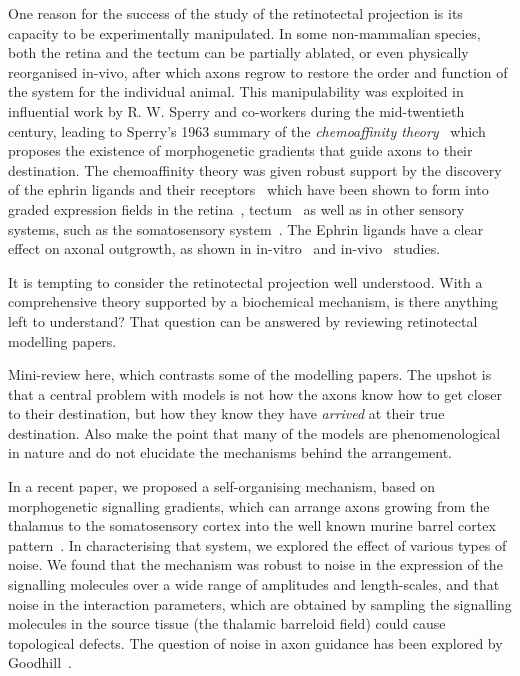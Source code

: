 \documentclass[11pt, a4paper]{article}
\begin{document}
One reason for the success of the study of the retinotectal projection is its
capacity to be experimentally manipulated. In some non-mammalian species, both
the retina and the tectum can be partially ablated, or even physically
reorganised in-vivo, after which axons regrow to restore the order and
function of the system for the individual animal. This manipulability was
exploited in influential work by R. W. Sperry and co-workers during the
mid-twentieth century, leading to Sperry's 1963 summary of
the \emph{chemoaffinity theory}~\cite{sperry_chemoaffinity_1963} which
proposes the existence of morphogenetic gradients that guide axons to their
destination. The chemoaffinity theory was given robust support by the
discovery of the ephrin ligands and their receptors~\cite{first_ephrin_paper}
which have been shown to form into graded expression fields in the
retina~\cite{ephrin_retina}, tectum~\cite{ephrin_tectum} as well as in other
sensory systems, such as the somatosensory
system~\cite{vanderhaegen_as_in_elife_paper}. The Ephrin ligands have a clear
effect on axonal outgrowth, as shown in in-vitro~\cite{one} and
in-vivo~\cite{another} studies.
%
%
%
%
%
%
%
%

It is tempting to consider the retinotectal projection well understood. With a
comprehensive theory supported by a biochemical mechanism, is there anything
left to understand? That question can be answered by reviewing retinotectal
modelling papers.

Mini-review here, which contrasts some of the modelling papers. The upshot is
that a central problem with models is not how the axons know how to get closer
to their destination, but how they know they have \emph{arrived} at their true
destination. Also make the point that many of the models are phenomenological
in nature and do not elucidate the mechanisms behind the arrangement.

In a recent paper, we proposed a self-organising mechanism, based on
morphogenetic signalling gradients, which can arrange
axons growing from the thalamus to the somatosensory cortex into the well
known murine barrel cortex pattern~\cite{james_modelling_2020}. In
characterising that system, we explored the effect of various types of
noise. We found that the mechanism was robust to noise in the expression of
the signalling molecules over a wide range of amplitudes and length-scales,
and that noise in the interaction parameters, which are obtained by sampling
the signalling molecules in the source tissue (the thalamic barreloid field)
could cause topological defects. The question of noise in axon guidance has
been explored by Goodhill~\cite{goodhill_can_2016}.
\end{document}
